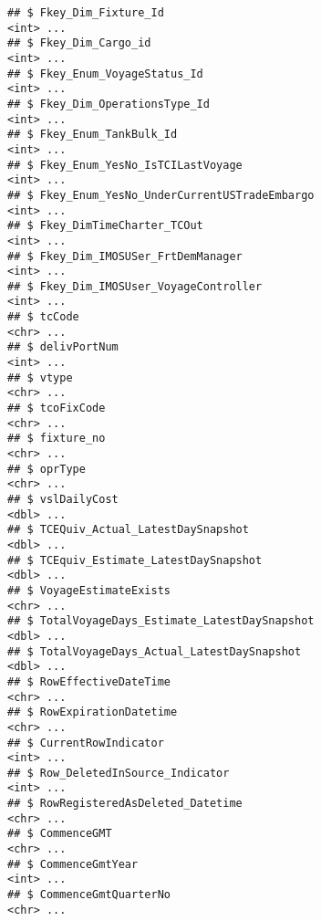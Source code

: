\documentclass[]{article}
\begin{document}
\begin{verbatim}
## $ Fkey_Dim_Fixture_Id                                                     <int> ...
## $ Fkey_Dim_Cargo_id                                                       <int> ...
## $ Fkey_Enum_VoyageStatus_Id                                               <int> ...
## $ Fkey_Dim_OperationsType_Id                                              <int> ...
## $ Fkey_Enum_TankBulk_Id                                                   <int> ...
## $ Fkey_Enum_YesNo_IsTCILastVoyage                                         <int> ...
## $ Fkey_Enum_YesNo_UnderCurrentUSTradeEmbargo                              <int> ...
## $ Fkey_DimTimeCharter_TCOut                                               <int> ...
## $ Fkey_Dim_IMOSUSer_FrtDemManager                                         <int> ...
## $ Fkey_Dim_IMOSUser_VoyageController                                      <int> ...
## $ tcCode                                                                  <chr> ...
## $ delivPortNum                                                            <int> ...
## $ vtype                                                                   <chr> ...
## $ tcoFixCode                                                              <chr> ...
## $ fixture_no                                                              <chr> ...
## $ oprType                                                                 <chr> ...
## $ vslDailyCost                                                            <dbl> ...
## $ TCEQuiv_Actual_LatestDaySnapshot                                        <dbl> ...
## $ TCEquiv_Estimate_LatestDaySnapshot                                      <dbl> ...
## $ VoyageEstimateExists                                                    <chr> ...
## $ TotalVoyageDays_Estimate_LatestDaySnapshot                              <dbl> ...
## $ TotalVoyageDays_Actual_LatestDaySnapshot                                <dbl> ...
## $ RowEffectiveDateTime                                                    <chr> ...
## $ RowExpirationDatetime                                                   <chr> ...
## $ CurrentRowIndicator                                                     <int> ...
## $ Row_DeletedInSource_Indicator                                           <int> ...
## $ RowRegisteredAsDeleted_Datetime                                         <chr> ...
## $ CommenceGMT                                                             <chr> ...
## $ CommenceGmtYear                                                         <int> ...
## $ CommenceGmtQuarterNo                                                    <chr> ...

\end{verbatim}
\end{document}
